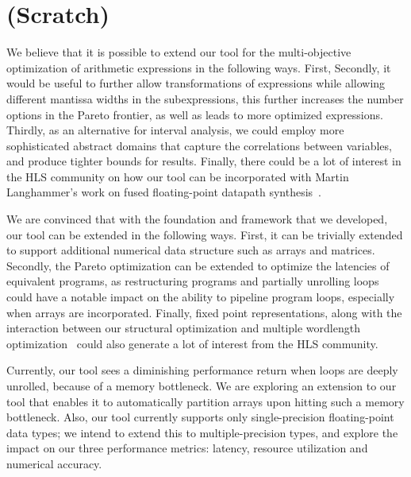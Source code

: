 \chapter{(Scratch)}

We believe that it is possible to extend our tool for the multi-objective
optimization of arithmetic expressions in the following ways. First, Secondly,
it would be useful to further allow transformations of expressions while
allowing different mantissa widths in the subexpressions, this further
increases the number options in the Pareto frontier, as well as leads to more
optimized expressions. Thirdly, as an alternative for interval analysis, we
could employ more sophisticated abstract domains that capture the correlations
between variables, and produce tighter bounds for results. Finally, there
could be a lot of interest in the HLS community on how our tool can be
incorporated with Martin Langhammer's work on fused floating-point datapath
synthesis~\cite{langhammer}.

We are convinced that with the foundation and framework that we developed,
our tool can be extended in the following ways.  First, it can be trivially
extended to support additional numerical data structure such as arrays and
matrices.  Secondly, the Pareto optimization can be extended to optimize the
latencies of equivalent programs, as restructuring programs and partially
unrolling loops could have a notable impact on the ability to pipeline
program loops, especially when arrays are incorporated.  Finally, fixed point
representations, along with the interaction between our structural optimization
and multiple wordlength optimization~\cite{constantinides} could also generate
a lot of interest from the HLS community.

Currently, our tool sees a diminishing performance return when loops are deeply
unrolled, because of a memory bottleneck. We are exploring an extension to
our tool that enables it to automatically partition arrays upon hitting such
a memory bottleneck. Also, our tool currently supports only single-precision
floating-point data types; we intend to extend this to multiple-precision
types, and explore the impact on our three performance metrics: latency,
resource utilization and numerical accuracy.


\cleardoublepage


{%
\renewcommand{\bibfont}{\normalfont\small}
\setlength{\biblabelsep}{0pt}
\setlength{\bibitemsep}{0.5\baselineskip plus 0.5\baselineskip}
\printbibliography[nottype=online]
\printbibliography[heading=subbibliography,title={Webseiten},type=online,prefixnumbers={@}]
}
\cleardoublepage

\listoffigures
\cleardoublepage

\listoftables
\cleardoublepage

% 

% 


